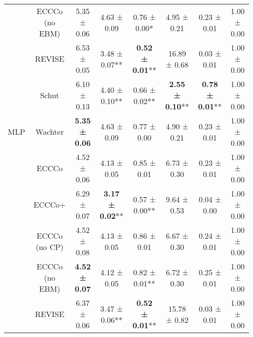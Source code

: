 \begin{table}
{\begin{tabular}[t]{cccccccc}
 & ECCCo (no EBM) & 5.35 ± 0.06\hphantom{*}\hphantom{*} & 4.63 ± 0.09\hphantom{*}\hphantom{*} & 0.76 ± 0.00*\hphantom{*} & 4.95 ± 0.21\hphantom{*}\hphantom{*} & 0.23 ± 0.01\hphantom{*}\hphantom{*} & 1.00 ± 0.00\hphantom{*}\hphantom{*}\\

 & REVISE & 6.53 ± 0.05\hphantom{*}\hphantom{*} & 3.48 ± 0.07** & \textbf{0.52 ± 0.01}** & 16.89 ± 0.68\hphantom{*}\hphantom{*} & 0.03 ± 0.01\hphantom{*}\hphantom{*} & 1.00 ± 0.00\hphantom{*}\hphantom{*}\\

 & Schut & 6.10 ± 0.13\hphantom{*}\hphantom{*} & 4.40 ± 0.10** & 0.66 ± 0.02** & \textbf{2.55 ± 0.10}** & \textbf{0.78 ± 0.01}** & 1.00 ± 0.00\hphantom{*}\hphantom{*}\\

\multirow[t]{-7}{*}{\centering\arraybackslash MLP} & Wachter & \textbf{5.35 ± 0.06}\hphantom{*}\hphantom{*} & 4.63 ± 0.09\hphantom{*}\hphantom{*} & 0.77 ± 0.00\hphantom{*}\hphantom{*} & 4.90 ± 0.21\hphantom{*}\hphantom{*} & 0.23 ± 0.01\hphantom{*}\hphantom{*} & 1.00 ± 0.00\hphantom{*}\hphantom{*}\\
\cmidrule{1-8}
 & ECCCo & 4.52 ± 0.06\hphantom{*}\hphantom{*} & 4.13 ± 0.05\hphantom{*}\hphantom{*} & 0.85 ± 0.01\hphantom{*}\hphantom{*} & 6.73 ± 0.30\hphantom{*}\hphantom{*} & 0.23 ± 0.01\hphantom{*}\hphantom{*} & 1.00 ± 0.00\hphantom{*}\hphantom{*}\\

 & ECCCo+ & 6.29 ± 0.07\hphantom{*}\hphantom{*} & \textbf{3.17 ± 0.02}** & 0.57 ± 0.00** & 9.64 ± 0.53\hphantom{*}\hphantom{*} & 0.04 ± 0.00\hphantom{*}\hphantom{*} & 1.00 ± 0.00\hphantom{*}\hphantom{*}\\

 & ECCCo (no CP) & 4.52 ± 0.08\hphantom{*}\hphantom{*} & 4.13 ± 0.05\hphantom{*}\hphantom{*} & 0.86 ± 0.01\hphantom{*}\hphantom{*} & 6.67 ± 0.30\hphantom{*}\hphantom{*} & 0.24 ± 0.01\hphantom{*}\hphantom{*} & 1.00 ± 0.00\hphantom{*}\hphantom{*}\\

 & ECCCo (no EBM) & \textbf{4.52 ± 0.07}\hphantom{*}\hphantom{*} & 4.12 ± 0.05\hphantom{*}\hphantom{*} & 0.82 ± 0.01** & 6.72 ± 0.30\hphantom{*}\hphantom{*} & 0.25 ± 0.01\hphantom{*}\hphantom{*} & 1.00 ± 0.00\hphantom{*}\hphantom{*}\\

 & REVISE & 6.37 ± 0.06\hphantom{*}\hphantom{*} & 3.47 ± 0.06** & \textbf{0.52 ± 0.01}** & 15.78 ± 0.82\hphantom{*}\hphantom{*} & 0.03 ± 0.01\hphantom{*}\hphantom{*} & 1.00 ± 0.00\hphantom{*}\hphantom{*}\\


\end{tabular}}
\end{table}
